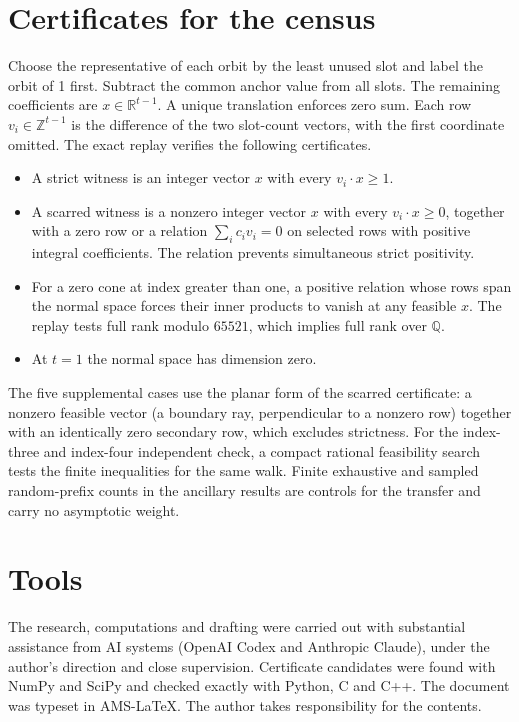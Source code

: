 \documentclass[11pt,reqno]{amsart}
\newcommand{\R}{\mathbb R}
\newcommand{\Z}{\mathbb Z}
\newcommand{\Q}{\mathbb Q}
\begin{document}
\section{Certificates for the census}\label{app:cert}
Choose the representative of each orbit by the least unused slot and label the orbit of 1 first. Subtract the common anchor value from all slots. The remaining coefficients are \(x\in\R^{t-1}\). A unique translation enforces zero sum. Each row \(v_i\in\Z^{t-1}\) is the difference of the two slot-count vectors, with the first coordinate omitted. The exact replay verifies the following certificates.
\begin{itemize}
\item A strict witness is an integer vector \(x\) with every \(v_i\cdot x\ge1\).
\item A scarred witness is a nonzero integer vector \(x\) with every \(v_i\cdot x\ge0\), together with a zero row or a relation \(\sum_i c_i v_i=0\) on selected rows with positive integral coefficients. The relation prevents simultaneous strict positivity.
\item For a zero cone at index greater than one, a positive relation whose rows span the normal space forces their inner products to vanish at any feasible \(x\). The replay tests full rank modulo \(65521\), which implies full rank over \(\Q\).
\item At \(t=1\) the normal space has dimension zero.
\end{itemize}
The five supplemental cases use the planar form of the scarred certificate: a nonzero feasible vector (a boundary ray, perpendicular to a nonzero row) together with an identically zero secondary row, which excludes strictness. For the index-three and index-four independent check, a compact rational feasibility search tests the finite inequalities for the same walk. Finite exhaustive and sampled random-prefix counts in the ancillary results are controls for the transfer and carry no asymptotic weight.

\section*{Tools}
The research, computations and drafting were carried out with substantial assistance from AI systems (OpenAI Codex and Anthropic Claude), under the author's direction and close supervision. Certificate candidates were found with NumPy and SciPy and checked exactly with Python, C and C++. The document was typeset in AMS-\LaTeX. The author takes responsibility for the contents.
\end{document}
